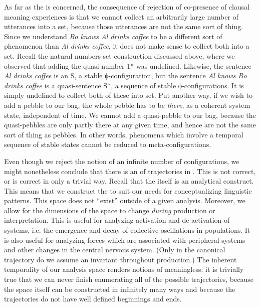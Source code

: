   As far as the  is concerned, the consequence of rejection of co-presence of clausal meaning experiences is that we cannot collect an arbitrarily large number of utterances into a set, because those utterances are not the same sort of thing. Since we understand \textit{Bo knows Al drinks coffee} to be a different sort of phenomenon than \textit{Al drinks coffee}, it does not make sense to collect both into a set. Recall the natural numbers set construction discussed above, where we observed that adding the quasi-number 1* was undefined. Likewise, the sentence \textit{Al drinks coffee} is an S, a stable ϕ-con\-fig\-u\-ra\-tion, but the sentence \textit{Al knows Bo drinks coffee} is a quasi-sentence S*, a sequence of stable ϕ-con\-fig\-u\-ra\-tions. It is simply undefined to collect both of these into set. Put another way, if we wish to add a pebble to our bag, the whole pebble has to be \textit{there}, as a coherent system state, independent of time. We cannot add a quasi-pebble to our bag, because the quasi-pebbles are only partly there at any given time, and hence are not the same sort of thing as pebbles. In other words, phenomena which involve a temporal sequence of stable states cannot be reduced to  meta-con\-fig\-u\-ra\-tions.

  Even though we reject the notion of an infinite number of configurations, we might nonetheless conclude that there is an  of trajectories in . This is not correct, or is correct in only a trivial way. Recall that the  itself is an analytical construct. This means that we construct the  to suit our needs for conceptualizing linguistic patterns. This space does not “exist” outside of a given analysis. Moreover, we allow for the dimensions of the space to change \textit{during} production or interpretation. This is useful for analyzing activation and de-activation of systems, i.e. the emergence and decay of collective oscillations in populations. It is also useful for analyzing  forces which are associated with peripheral  systems and other changes in the central nervous system. (Only in the canonical trajectory do we assume an invariant  throughout production.) The inherent temporality of our analysis space renders notions of  meaningless: it is trivially true that we can never finish enumerating all of the possible trajectories, because the space itself can be constructed in infinitely many ways and because the trajectories do not have well defined beginnings and ends.

